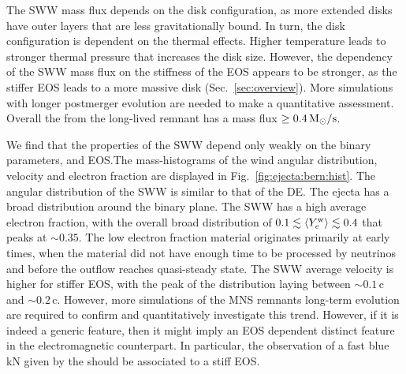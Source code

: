 The \ac{SWW} mass flux depends on the disk configuration, as more extended disks 
have outer layers that are less gravitationally bound. In turn, the disk 
configuration is dependent on the thermal effects. Higher temperature leads to 
stronger thermal pressure that increases the disk size. 
However, the dependency of the \ac{SWW} mass flux on the stiffness of the \ac{EOS} 
appears to be stronger, as the stiffer \ac{EOS} leads to a more massive disk 
(Sec.~\ref{sec:overview}). More simulations with longer postmerger evolution are needed 
to make a quantitative assessment. 
Overall the \swind{} from the long-lived remnant has a mass flux $\geq 0.4\, {\text{M}_{\odot}}/{\text{s}}$.

We find that the properties of the \ac{SWW} depend only weakly on the binary parameters,
\mr{} and \ac{EOS}.The mass-histograms of the wind angular distribution, velocity and 
electron fraction are displayed in Fig.~\ref{fig:ejecta:bern:hist}. 
The angular distribution of the \ac{SWW} is similar to that of the \ac{DE}. The ejecta 
has a broad distribution around the binary plane.
The \ac{SWW} has a high average electron fraction, with the overall 
broad distribution of $0.1\lesssim \langle Y^{\text{w}}_{e}\rangle\lesssim0.4$ that peaks at ${\sim}0.35$.
The low electron fraction material originates primarily at early times, when the 
material did not have enough time to be processed by neutrinos and before the 
outflow reaches quasi-steady state.
The \ac{SWW} average velocity is higher for stiffer \ac{EOS}, with the peak 
of the distribution laying between ${\sim}0.1\,$c and ${\sim}0.2\,$c.
However, more simulations of the \ac{MNS} remnants long-term evolution are 
required to confirm and quantitatively investigate this trend.
However, if it is indeed a generic feature, then it might imply 
an EOS dependent distinct feature in the electromagnetic counterpart. 
In particular, the observation of a fast blue kN given by the \swind{}
should be associated to a stiff EOS.



\subsection{\nwind{}}


